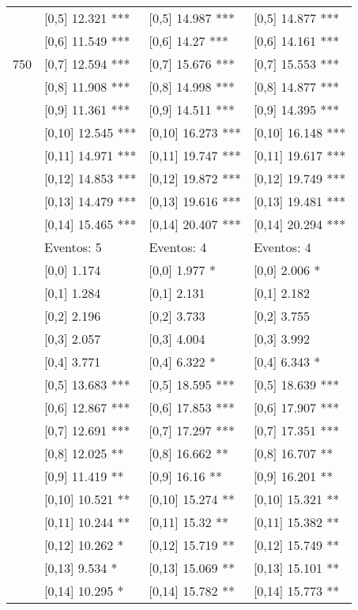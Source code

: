 \begin{table}
\begin{tabular}[t]{llll}
 & {}[0,5] 12.321 *** & {}[0,5] 14.987 *** & {}[0,5] 14.877 ***\\
 & {}[0,6] 11.549 *** & {}[0,6] 14.27 *** & {}[0,6] 14.161 ***\\
750 & {}[0,7] 12.594 *** & {}[0,7] 15.676 *** & {}[0,7] 15.553 ***\\
\addlinespace
 & {}[0,8] 11.908 *** & {}[0,8] 14.998 *** & {}[0,8] 14.877 ***\\
 & {}[0,9] 11.361 *** & {}[0,9] 14.511 *** & {}[0,9] 14.395 ***\\
 & {}[0,10] 12.545 *** & {}[0,10] 16.273 *** & {}[0,10] 16.148 ***\\
 & {}[0,11] 14.971 *** & {}[0,11] 19.747 *** & {}[0,11] 19.617 ***\\
 & {}[0,12] 14.853 *** & {}[0,12] 19.872 *** & {}[0,12] 19.749 ***\\
\addlinespace
 & {}[0,13] 14.479 *** & {}[0,13] 19.616 *** & {}[0,13] 19.481 ***\\
 & {}[0,14] 15.465 *** & {}[0,14] 20.407 *** & {}[0,14] 20.294 ***\\
 & Eventos:  5 & Eventos:  4 & Eventos:  4\\
 & {}[0,0] 1.174 & {}[0,0] 1.977 * & {}[0,0] 2.006 *\\
 & {}[0,1] 1.284 & {}[0,1] 2.131 & {}[0,1] 2.182\\
\addlinespace
 & {}[0,2] 2.196 & {}[0,2] 3.733 & {}[0,2] 3.755\\
 & {}[0,3] 2.057 & {}[0,3] 4.004 & {}[0,3] 3.992\\
 & {}[0,4] 3.771 & {}[0,4] 6.322 * & {}[0,4] 6.343 *\\
 & {}[0,5] 13.683 *** & {}[0,5] 18.595 *** & {}[0,5] 18.639 ***\\
 & {}[0,6] 12.867 *** & {}[0,6] 17.853 *** & {}[0,6] 17.907 ***\\
\addlinespace
1000 & {}[0,7] 12.691 *** & {}[0,7] 17.297 *** & {}[0,7] 17.351 ***\\
 & {}[0,8] 12.025 ** & {}[0,8] 16.662 ** & {}[0,8] 16.707 **\\
 & {}[0,9] 11.419 ** & {}[0,9] 16.16 ** & {}[0,9] 16.201 **\\
 & {}[0,10] 10.521 ** & {}[0,10] 15.274 ** & {}[0,10] 15.321 **\\
 & {}[0,11] 10.244 ** & {}[0,11] 15.32 ** & {}[0,11] 15.382 **\\
\addlinespace
 & {}[0,12] 10.262 * & {}[0,12] 15.719 ** & {}[0,12] 15.749 **\\
 & {}[0,13] 9.534 * & {}[0,13] 15.069 ** & {}[0,13] 15.101 **\\
 & {}[0,14] 10.295 * & {}[0,14] 15.782 ** & {}[0,14] 15.773 **\\
\bottomrule
\end{tabular}
\end{table}
